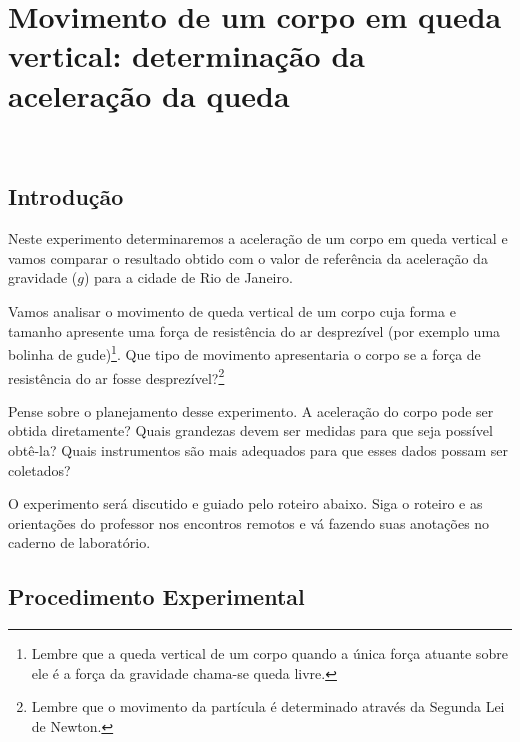 
\chapter{ Movimento de um corpo em queda vertical: determinação da aceleração da queda } \\

\vspace{-0.7cm}

\section{Introdução}
Neste experimento determinaremos a aceleração de um corpo em queda vertical e vamos 
comparar o resultado obtido com o valor de referência da aceleração da gravidade ($g$)
para a cidade de Rio de Janeiro. 
\par
Vamos analisar o movimento de queda vertical de um corpo cuja forma e tamanho apresente uma força de resistência do ar desprezível (por exemplo uma bolinha de gude)\footnote{Lembre que a queda vertical de um corpo quando a única força atuante sobre ele é a força da gravidade chama-se queda livre.}. Que tipo de movimento 
apresentaria o corpo se a força de resistência do ar fosse desprezível?\footnote{Lembre que o movimento da partícula é determinado através da Segunda Lei de Newton.}
\par 
Pense sobre o planejamento desse experimento. A aceleração do corpo pode ser obtida diretamente? Quais grandezas devem ser medidas para que seja possível obtê-la? Quais instrumentos são mais adequados para que esses dados possam ser coletados?
\par 
O experimento será discutido e guiado pelo roteiro abaixo. Siga o roteiro e as orientações do professor 
nos encontros remotos e vá fazendo suas anotações no caderno de laboratório. 

\section{Procedimento Experimental}

